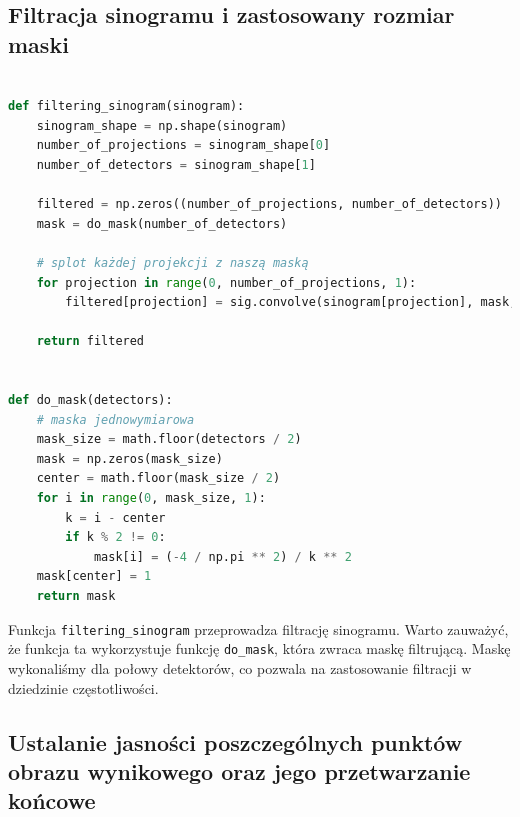 \documentclass[11pt,a4paper]{article}
\begin{document}
    \subsection{Filtracja sinogramu i zastosowany rozmiar maski}
\begin{lstlisting}[language=Python, basicstyle=\normal, breaklines=true]

def filtering_sinogram(sinogram):
    sinogram_shape = np.shape(sinogram)
    number_of_projections = sinogram_shape[0]
    number_of_detectors = sinogram_shape[1]

    filtered = np.zeros((number_of_projections, number_of_detectors))
    mask = do_mask(number_of_detectors)

    # splot każdej projekcji z naszą maską
    for projection in range(0, number_of_projections, 1):
        filtered[projection] = sig.convolve(sinogram[projection], mask, mode='same', method='direct')

    return filtered


def do_mask(detectors):
    # maska jednowymiarowa
    mask_size = math.floor(detectors / 2)
    mask = np.zeros(mask_size)
    center = math.floor(mask_size / 2)
    for i in range(0, mask_size, 1):
        k = i - center
        if k % 2 != 0:
            mask[i] = (-4 / np.pi ** 2) / k ** 2
    mask[center] = 1
    return mask
\end{lstlisting}
    Funkcja \texttt{filtering\_sinogram} przeprowadza filtrację sinogramu.
    Warto zauważyć, że funkcja ta wykorzystuje funkcję \texttt{do\_mask}, która zwraca maskę filtrującą.
    Maskę wykonaliśmy dla połowy detektorów, co pozwala na zastosowanie filtracji w dziedzinie częstotliwości.
    \subsection{Ustalanie jasności poszczególnych punktów obrazu wynikowego oraz jego przetwarzanie końcowe}
\end{document}
